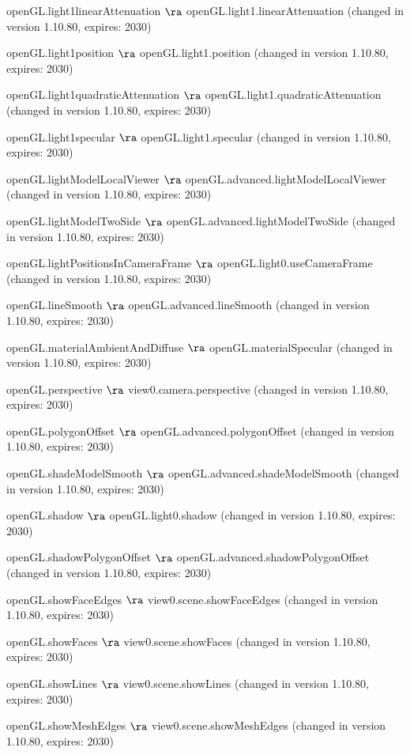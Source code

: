   \item openGL.light1linearAttenuation $\ra$ openGL.light1.linearAttenuation (changed in version 1.10.80, expires: 2030)
  \item openGL.light1position $\ra$ openGL.light1.position (changed in version 1.10.80, expires: 2030)
  \item openGL.light1quadraticAttenuation $\ra$ openGL.light1.quadraticAttenuation (changed in version 1.10.80, expires: 2030)
  \item openGL.light1specular $\ra$ openGL.light1.specular (changed in version 1.10.80, expires: 2030)
  \item openGL.lightModelLocalViewer $\ra$ openGL.advanced.lightModelLocalViewer (changed in version 1.10.80, expires: 2030)
  \item openGL.lightModelTwoSide $\ra$ openGL.advanced.lightModelTwoSide (changed in version 1.10.80, expires: 2030)
  \item openGL.lightPositionsInCameraFrame $\ra$ openGL.light0.useCameraFrame (changed in version 1.10.80, expires: 2030)
  \item openGL.lineSmooth $\ra$ openGL.advanced.lineSmooth (changed in version 1.10.80, expires: 2030)
  \item openGL.materialAmbientAndDiffuse $\ra$ openGL.materialSpecular (changed in version 1.10.80, expires: 2030)
  \item openGL.perspective $\ra$ view0.camera.perspective (changed in version 1.10.80, expires: 2030)
  \item openGL.polygonOffset $\ra$ openGL.advanced.polygonOffset (changed in version 1.10.80, expires: 2030)
  \item openGL.shadeModelSmooth $\ra$ openGL.advanced.shadeModelSmooth (changed in version 1.10.80, expires: 2030)
  \item openGL.shadow $\ra$ openGL.light0.shadow (changed in version 1.10.80, expires: 2030)
  \item openGL.shadowPolygonOffset $\ra$ openGL.advanced.shadowPolygonOffset (changed in version 1.10.80, expires: 2030)
  \item openGL.showFaceEdges $\ra$ view0.scene.showFaceEdges (changed in version 1.10.80, expires: 2030)
  \item openGL.showFaces $\ra$ view0.scene.showFaces (changed in version 1.10.80, expires: 2030)
  \item openGL.showLines $\ra$ view0.scene.showLines (changed in version 1.10.80, expires: 2030)
  \item openGL.showMeshEdges $\ra$ view0.scene.showMeshEdges (changed in version 1.10.80, expires: 2030)
